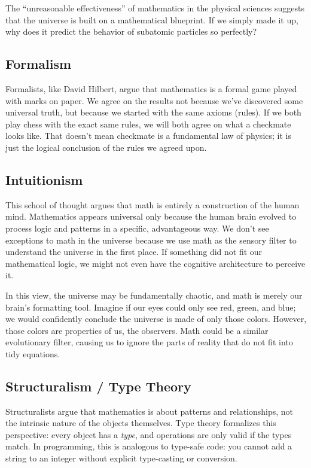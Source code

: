 The ``unreasonable effectiveness'' of mathematics in the physical sciences suggests that the universe is built on a mathematical blueprint.
If we simply made it up, why does it predict the behavior of subatomic particles so perfectly?

\subsection*{Formalism}

Formalists, like David Hilbert, argue that mathematics is a formal game played with marks on paper.
We agree on the results not because we've discovered some universal truth, but because we started with the same axioms (rules).
If we both play chess with the exact same rules, we will both agree on what a checkmate looks like.
That doesn't mean checkmate is a fundamental law of physics; it is just the logical conclusion of the rules we agreed upon.

\subsection*{Intuitionism}

This school of thought argues that math is entirely a construction of the human mind.
Mathematics appears universal only because the human brain evolved to process logic and patterns in a specific, advantageous way.
We don't see exceptions to math in the universe because we use math as the sensory filter to understand the universe in the first place.
If something did not fit our mathematical logic, we might not even have the cognitive architecture to perceive it.

In this view, the universe may be fundamentally chaotic, and math is merely our brain's formatting tool.
Imagine if our eyes could only see red, green, and blue;
we would confidently conclude the universe is made of only those colors.
However, those colors are properties of us, the observers. Math could be a similar evolutionary filter, causing us to ignore the parts of reality that do not fit into tidy equations.

\subsection*{Structuralism / Type Theory}

Structuralists argue that mathematics is about patterns and relationships, not the intrinsic nature of the objects themselves.  
Type theory formalizes this perspective: every object has a \emph{type}, and operations are only valid if the types match.
In programming, this is analogous to type-safe code: you cannot add a string to an integer without explicit type-casting or conversion.

